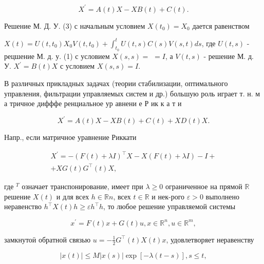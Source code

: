 \documentclass[10pt]{article}
\begin{document}
\[

X^{\prime}=A(t) X-X B(t)+C(t) .

\]



Решение М. Д. У. (3) с начальным условием $X\left(t_{0}\right)=X_{0}$ дается равенством



$X(t)=U\left(t, t_{0}\right) X_{0} V\left(t, t_{0}\right)+\int_{t_{0}}^{t} U(t, s) C(s) V(s, t) d s$, где $U(t, s)$ - рецшение М. д. у. (1) с условием $X(s, s)=$ $=I$, а $V(t, s)$ - решение М. д. У. $X^{\prime}=B(t) X$ с условием $X(s, s)=I$.



В различных прикладных задачах (теории стабилизации, оптимального управления, фильтрации управляемых систем и др.) большую роль играет т. н. м а тричное дифффе ренциальное ур авнени е Р ик к а т и



\[

X^{\prime}=A(t) X-X B(t)+C(t)+X D(t) X .

\]



Напр., если матричное уравнение Риккати



\[

\begin{gathered}

X^{\prime}=-(F(t)+\lambda I)^{\top} X-X(F(t)+\lambda I)-I+ \\

+X G(t) G^{\top}(t) X,

\end{gathered}

\]



где ${ }^{T}$ означает транспонирование, имеет при $\lambda \geqslant 0$ ограниченное на прямой $\mathbb{R}$ решение $X(t)$ и для всех $h \in \mathbb{R} n$, всех $t \in \mathbb{R}$ и нек-рого $\varepsilon>0$ выполнено неравенство $h^{\top} X(t) h \geqslant \varepsilon h^{\top} h$, то любое решение управляемой системы



\[

x^{\prime}=F(t) x+G(t) u, x \in \mathbb{R}^{n}, u \in \mathbb{R}^{m},

\]



замкнутоӥ обратной связью $u=-\frac{1}{2} G^{\top}(t) X(t) x$, удовлетворяет неравенству



\[

|x(t)| \leqslant M|x(s)| \exp [-\lambda(t-s)], s \leqslant t,

\]
\end{document}
